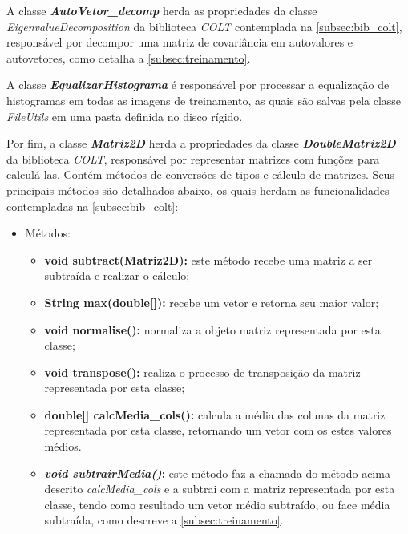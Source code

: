 A classe \textit{\textbf{AutoVetor\_decomp}} herda as propriedades da classe \textit{EigenvalueDecomposition} da biblioteca \textit{COLT} contemplada na \autoref{subsec:bib_colt}, responsável por decompor uma matriz de covariância em autovalores e autovetores, como detalha a \autoref{subsec:treinamento}.


A classe \textit{\textbf{EqualizarHistograma}} é responsável por processar a equalização de histogramas em todas as imagens de treinamento, as quais são salvas pela classe \textit{FileUtils} em uma pasta definida no disco rígido.


Por fim, a classe \textit{\textbf{Matriz2D}} herda a propriedades da classe \textit{\textbf{DoubleMatriz2D }} da biblioteca \textit{COLT}, responsável por representar matrizes com funções para calculá-las. Contém métodos de conversões de tipos e cálculo de matrizes. Seus principais métodos são detalhados abaixo, os quais herdam as funcionalidades contempladas na \autoref{subsec:bib_colt}:
\begin{itemize}	
	\item Métodos:
	\begin{itemize}
		\item \textbf{void subtract(Matriz2D):} este método recebe uma matriz a ser subtraída e realizar o cálculo;
		
		\item \textbf{String max(double[]):} recebe um vetor e retorna seu maior valor;
		
		\item \textbf{void normalise():} normaliza a objeto matriz representada por esta classe;
		
		\item \textbf{void transpose():} realiza o processo de transposição da matriz representada por esta classe;
		
		\item \textbf{double[] calcMedia\_cols():} calcula a média das colunas da matriz representada por esta classe, retornando um vetor com os estes valores médios.
		
		\item \textbf{\textit{void subtrairMedia()}:} este método faz a chamada do método acima descrito 		 \textit{calcMedia\_cols} e a subtrai com a matriz representada por esta classe, tendo como resultado um vetor médio subtraído, ou face média subtraída, como descreve a \autoref{subsec:treinamento}.

	\end{itemize}
\end{itemize}



